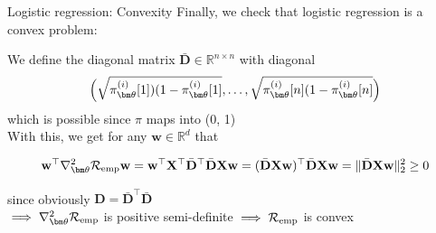 \documentclass[11pt,compress,t,notes=noshow, xcolor=table]{beamer}
\begin{document}
\begin{frame}{Logistic regression: Convexity}
Finally, we check that logistic regression is a convex problem:
\vfill

We define the diagonal matrix $\bar{\mathbf{D}} \in \mathbb{R}^{n \times n}$ with diagonal 
$$\Big(\sqrt{ \pi^{(i)}_{\thetav}[1])(1- \pi^{(i)}_{\thetav}[1]}, \dots, \sqrt{ \pi^{(i)}_{\thetav}[n](1- \pi^{(i)}_{\thetav}[n]}\Big) $$
which is possible since $\pi$ maps into (0, 1) \\
\vfill
With this, we get for any $\mathbf{w} \in \mathbb{R}^d$ that

$$\mathbf{w}^\top  \nabla^2_{\thetav}\riske \mathbf{w} =   \mathbf{w}^\top  \mathbf{X}^\top \bar{\mathbf{D}}^\top \bar{\mathbf{D}}\mathbf{X} \mathbf{w} = (\bar{\mathbf{D}}\mathbf{X} \mathbf{w})^\top\bar{\mathbf{D}}\mathbf{X} \mathbf{w} = \Vert \bar{\mathbf{D}}\mathbf{X} \mathbf{w} \Vert^2_2 \geq 0$$

since obviously $\mathbf{D} = \bar{\mathbf{D}}^\top \bar{\mathbf{D}}$ \\
\vfill
$\implies \nabla^2_{\thetav}\riske$ is positive semi-definite $\implies \mathcal{R}_{\text{emp}}$ is convex

\end{frame}

\endlecture
\end{document}
